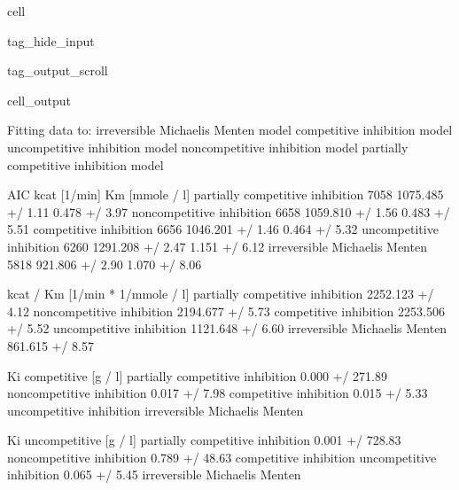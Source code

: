 \documentclass[letterpaper,10pt,english]{jupyterBook}
\begin{document}
\begin{sphinxuseclass}{cell}
\begin{sphinxuseclass}{tag_hide_input}
\begin{sphinxuseclass}{tag_output_scroll}
\begin{sphinxVerbatimOutput}
\begin{sphinxuseclass}{cell_output}
\noindent{}

\begin{sphinxVerbatim}[commandchars=\\\{\}]
Fitting data to:
 \PYGZhy{} irreversible Michaelis Menten model
 \PYGZhy{} competitive inhibition model
 \PYGZhy{} uncompetitive inhibition model
 \PYGZhy{} non\PYGZhy{}competitive inhibition model
 \PYGZhy{} partially competitive inhibition model
\end{sphinxVerbatim}

\begin{sphinxVerbatim}[commandchars=\\\{\}]
                                   AIC        kcat [1/min]   Km [mmole / l]  \PYGZbs{}
partially competitive inhibition \PYGZhy{}7058  1075.485 +/\PYGZhy{} 1.11\PYGZpc{}  0.478 +/\PYGZhy{} 3.97\PYGZpc{}   
non\PYGZhy{}competitive inhibition       \PYGZhy{}6658  1059.810 +/\PYGZhy{} 1.56\PYGZpc{}  0.483 +/\PYGZhy{} 5.51\PYGZpc{}   
competitive inhibition           \PYGZhy{}6656  1046.201 +/\PYGZhy{} 1.46\PYGZpc{}  0.464 +/\PYGZhy{} 5.32\PYGZpc{}   
uncompetitive inhibition         \PYGZhy{}6260  1291.208 +/\PYGZhy{} 2.47\PYGZpc{}  1.151 +/\PYGZhy{} 6.12\PYGZpc{}   
irreversible Michaelis Menten    \PYGZhy{}5818   921.806 +/\PYGZhy{} 2.90\PYGZpc{}  1.070 +/\PYGZhy{} 8.06\PYGZpc{}   

                                 kcat / Km [1/min * 1/mmole / l]  \PYGZbs{}
partially competitive inhibition              2252.123 +/\PYGZhy{} 4.12\PYGZpc{}   
non\PYGZhy{}competitive inhibition                    2194.677 +/\PYGZhy{} 5.73\PYGZpc{}   
competitive inhibition                        2253.506 +/\PYGZhy{} 5.52\PYGZpc{}   
uncompetitive inhibition                      1121.648 +/\PYGZhy{} 6.60\PYGZpc{}   
irreversible Michaelis Menten                  861.615 +/\PYGZhy{} 8.57\PYGZpc{}   

                                 Ki competitive [g / l]  \PYGZbs{}
partially competitive inhibition      0.000 +/\PYGZhy{} 271.89\PYGZpc{}   
non\PYGZhy{}competitive inhibition              0.017 +/\PYGZhy{} 7.98\PYGZpc{}   
competitive inhibition                  0.015 +/\PYGZhy{} 5.33\PYGZpc{}   
uncompetitive inhibition                              \PYGZhy{}   
irreversible Michaelis Menten                         \PYGZhy{}   

                                 Ki uncompetitive [g / l]  
partially competitive inhibition        0.001 +/\PYGZhy{} 728.83\PYGZpc{}  
non\PYGZhy{}competitive inhibition               0.789 +/\PYGZhy{} 48.63\PYGZpc{}  
competitive inhibition                                  \PYGZhy{}  
uncompetitive inhibition                  0.065 +/\PYGZhy{} 5.45\PYGZpc{}  
irreversible Michaelis Menten                           \PYGZhy{}  
\end{sphinxVerbatim}


\end{sphinxuseclass}
\end{sphinxVerbatimOutput}
\end{sphinxuseclass}
\end{sphinxuseclass}
\end{sphinxuseclass}
\end{document}
